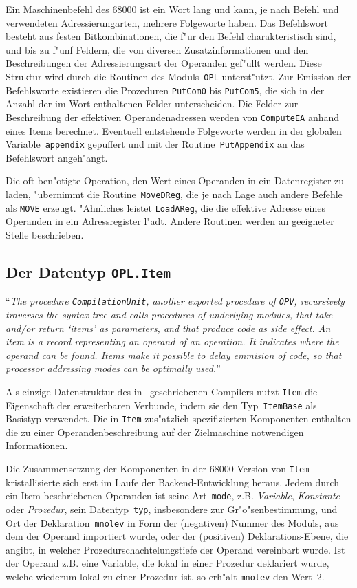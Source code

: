 Ein Maschinenbefehl des 68000 ist ein Wort lang und kann, je nach Befehl
und verwendeten Adressierungarten, mehrere Folgeworte haben.
Das Befehlswort besteht aus festen Bitkombinationen, die f"ur den Befehl
charakteristisch sind, und bis zu f"unf Feldern, die von diversen
Zusatzinformationen und den Beschreibungen der Adressierungsart der
Operanden gef"ullt werden.
Diese Struktur wird durch die Routinen des Moduls~{\tt OPL} unterst"utzt.
Zur Emission der Befehlsworte existieren die Prozeduren {\tt PutCom0} bis
{\tt PutCom5}, die sich in der Anzahl der im Wort enthaltenen Felder
unterscheiden.
Die Felder zur Beschreibung der effektiven Operandenadressen werden von
{\tt ComputeEA} anhand eines Items berechnet.
Eventuell entstehende Folgeworte werden in der globalen Variable~{\tt appendix}
gepuffert und mit der Routine~{\tt PutAppendix} an das Befehlswort angeh"angt.

Die oft ben"otigte Operation, den Wert eines Operanden in ein Datenregister
zu laden, "ubernimmt die Routine~{\tt MoveDReg}, die je nach Lage auch
andere Befehle als {\tt MOVE} erzeugt.
"Ahnliches leistet {\tt LoadAReg}, die die effektive Adresse eines Operanden
in ein Adressregister l"adt.
Andere Routinen werden an geeigneter Stelle beschrieben.


\subsection{Der Datentyp {\tt OPL.Item}}
\label{Item}

"`{\it The procedure\/ {\tt CompilationUnit}, another exported procedure of\/ {\tt OPV},
recursively traverses the syntax tree and calls procedures of underlying
modules, that take and/or return `items' as parameters, and that produce
code as side effect.
An item is a record representing an operand of an operation.
It indicates where the operand can be found.
Items make it possible to delay emmision of code, so that processor addressing
modes can be optimally used.}"' \cite[S.~35]{op2doc}

Als einzige Datenstruktur des in \oberon\ geschriebenen Compilers nutzt
{\tt Item} die Eigenschaft der erweiterbaren Verbunde, indem sie den
Typ~{\tt ItemBase} als Basistyp verwendet.
Die in {\tt Item} zus"atzlich spezifizierten Komponenten enthalten die
zu einer Operandenbeschreibung auf der Zielmaschine notwendigen Informationen.

Die Zusammensetzung der Komponenten in der 68000-Version von {\tt Item}
kristallisierte sich erst im Laufe der Backend-Entwicklung heraus.
Jedem durch ein Item beschriebenen Operanden ist seine Art~{\tt mode},
z.B. {\it Variable}, {\it Konstante} oder {\it Prozedur}, sein Datentyp~{\tt typ},
insbesondere zur Gr"o"senbestimmung, und Ort der Deklaration~{\tt mnolev}
in Form der (negativen) Nummer des Moduls, aus dem der Operand importiert
wurde, oder der (positiven) Deklarations-Ebene, die angibt, in welcher
Prozedurschachtelungstiefe der Operand vereinbart wurde.
Ist der Operand z.B. eine Variable, die lokal in einer Prozedur deklariert wurde,
welche wiederum lokal zu einer Prozedur ist, so erh"alt {\tt mnolev} den
Wert~2.

